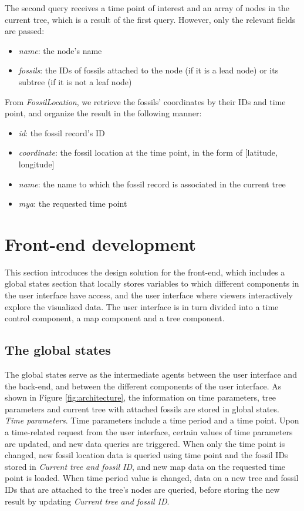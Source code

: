 \documentclass[11pt, a4paper,oneside,chapterprefix=false]{scrbook}
\begin{document}
The second query receives a time point of interest and an array of nodes in the current tree, which is a result of the first query. However, only the relevant fields are passed: 
\begin{itemize}
	\item \textit{name}: the node's name
	\item \textit{fossils}: the IDs of fossils attached to the node (if it is a lead node) or its subtree (if it is not a leaf node)
\end{itemize}

From \emph{FossilLocation}, we retrieve the fossils' coordinates by their IDs and time point, and organize the result in the following manner:

\begin{itemize}
	\item \textit{id}: the fossil record's ID
	\item \textit{coordinate}: the fossil location at the time point, in the form of [latitude, longitude]
	\item \textit{name}: the name to which the fossil record is associated in the current tree
	\item \textit{mya}: the requested time point 
\end{itemize}

\section{Front-end development} \label{sec:tec_frontend}
This section introduces the design solution for the front-end, which includes a global states section that locally stores variables to which different components in the user interface have access, and the user interface where viewers interactively explore the visualized data. The user interface is in turn divided into a time control component, a map component and a tree component. 
\subsection{The global states}\label{subsec:tec_frontend_global_states}
The global states serve as the intermediate agents between the user interface and the back-end, and between the different components of the user interface. As shown in Figure \ref{fig:architecture}, the information on time parameters, tree parameters and current tree with attached fossils are stored in global states. \\

\emph{Time parameters}. Time parameters include a time period and a time point. Upon a time-related request from the user interface, certain values of time parameters are updated, and new data queries are triggered. When only the time point is changed, new fossil location data is queried using time point and the fossil IDs stored in \emph{Current tree and fossil ID}, and new map data on the requested time point is loaded. When time period value is changed, data on a new tree and fossil IDs that are attached to the tree's nodes are queried, before storing the new result by updating \emph{Current tree and fossil ID}. \\
\end{document}
